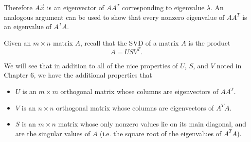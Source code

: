 \documentclass{ximera}
\begin{document}
Therefore $A\vec{x}$ is an eigenvector of $AA^T$ corresponding to eigenvalue
$\lambda$.  An analogous argument can be used to show that every
nonzero eigenvalue of $AA^T$ is an eigenvalue of $A^TA$.

 
Given an $m\times n$ matrix $A$, recall that the SVD of a matrix $A$ is the product
\[ A=US V^T.\]

We will see that in addition to all of the nice properties of $U$, $S$, and $V$ noted in Chapter 6, we have the additional properties that

\begin{itemize}
\item $U$ is an $m\times m$ orthogonal matrix whose columns are
eigenvectors of $AA^T$.
\item $V$ is an $n\times n$ orthogonal matrix whose columns are
eigenvectors of $A^TA$.
\item $S$ is an $m\times n$ matrix whose only nonzero values
lie on its main diagonal, and are the singular values of $A$ (i.e. the square root of the eigenvalues of $A^TA$).
\end{itemize}
\end{document}
